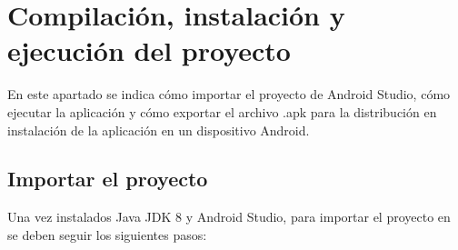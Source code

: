 \section{Compilación, instalación y ejecución del proyecto}

En este apartado se indica cómo importar el proyecto de Android Studio, cómo ejecutar la aplicación y cómo exportar el archivo .apk para la distribución en instalación de la aplicación en un dispositivo Android. 

\subsection{Importar el proyecto}

Una vez instalados Java JDK 8 y Android Studio, para importar el proyecto en se deben seguir los siguientes pasos: 

